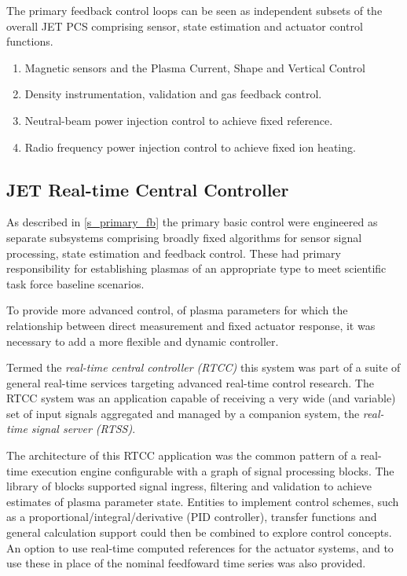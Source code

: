 \documentclass[preprint,12pt]{elsarticle}
\begin{document}
\label{s_primary_fb}

The primary feedback control loops can be seen as independent subsets of the overall JET PCS
comprising sensor, state estimation and actuator control functions.

\begin{enumerate}
	\item{Magnetic sensors and the Plasma Current, Shape and Vertical Control}
	\item{Density instrumentation, validation and gas feedback control.}
	\item{Neutral-beam power injection control to achieve fixed reference.}
	\item{Radio frequency power injection control to achieve fixed ion heating.}
\end{enumerate}

\subsection{JET Real-time Central Controller}
\label{s_rtcc}

As described in \ref{s_primary_fb} the primary basic control were
engineered as separate subsystems comprising broadly fixed algorithms
for sensor signal processing, state estimation and feedback control.
These had primary responsibility for establishing plasmas of an
appropriate type to meet scientific task force baseline scenarios.

To provide more advanced control, of plasma parameters for which the
relationship between direct measurement and fixed actuator response, 
it was necessary to add a more flexible and dynamic controller.

Termed the {\em real-time central controller (RTCC)} this system was
part of a suite of general real-time services targeting advanced
real-time control research.  The RTCC system was an application 
capable of receiving a very wide (and variable) set of input signals
aggregated and managed by a companion system, the {\em real-time signal server (RTSS)}.

The architecture of this RTCC application was the common pattern of
a real-time execution engine configurable with a graph of signal
processing blocks.  The library of blocks supported signal ingress,
filtering and validation to achieve estimates of plasma parameter
state.  Entities to implement control schemes, such as a proportional/integral/derivative
(PID controller), transfer functions and general calculation support
could then be combined to explore control concepts.  An option to
use real-time computed references for the actuator systems, and to 
use these in place of the nominal feedfoward time series was also
provided.
\end{document}
